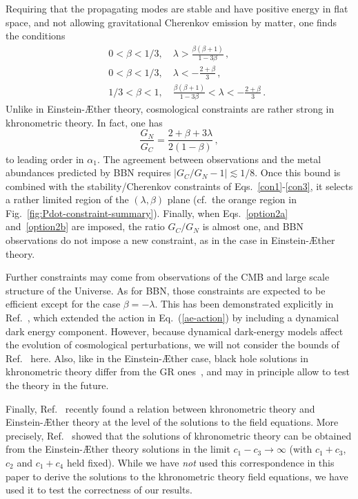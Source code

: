 \documentclass[prd,aps,twocolumn,nofootinbib,showpacs,superscriptaddress]{revtex4-1}
\newcommand\be{\begin{equation}}
\newcommand\ba{\begin{eqnarray}}
\newcommand\ee{\end{equation}}
\newcommand\ea{\end{eqnarray}}
\begin{document}
Requiring that the propagating modes are stable and have positive energy
in flat space, and not allowing gravitational Cherenkov emission by matter, one finds the conditions~\cite{Blas:2010hb,Barausse:2011pu,Elliott:2005va}
\ba
\label{con1}
&&0<\beta<1/3, \quad \lambda > \frac{\beta (\beta+1)}{1-3\beta}\, ,\\\label{con2}
&& 0<\beta<1/3, \quad \lambda<- \frac{2+\beta}{3}\, ,\\\label{con3}
&&1/3<\beta<1,\quad \frac{\beta (\beta+1)} {1-3\beta}<\lambda<- \frac{2+\beta}{3}\,.
\ea
Unlike in Einstein-\AE ther theory, cosmological constraints are rather strong in khronometric theory. In fact, one has
\be
\label{eq:GC-khronometric}
\frac{G_N}{G_C}=\frac{2+\beta+3\lambda}{2(1-\beta)}\, ,
\ee
to leading order in $\alpha_{1}$.  
The agreement between observations and the metal abundances predicted by BBN requires $|G_C/G_N-1|\lesssim 1/8$. Once this bound is combined with the stability/Cherenkov constraints of Eqs.~\eqref{con1}-\eqref{con3}, it selects a rather limited region of the $(\lambda,\beta)$ plane (cf.~the orange region in Fig.~\ref{fig:Pdot-constraint-summary}). Finally, when Eqs.~\eqref{option2a} and~\eqref{option2b} are imposed, the ratio $G_C/G_N$ is almost one, and BBN observations do not impose a new constraint, as in the case in Einstein-\AE ther theory.

Further constraints may come from observations of the CMB and large scale structure of the
Universe. As for BBN, those constraints are expected to be efficient except for the case $\beta=-\lambda$.
This has been demonstrated explicitly in Ref.~\cite{Audren:2013dwa}, which extended the action in Eq.~(\ref{ae-action}) by including a 
dynamical dark energy component. However,
because dynamical  dark-energy models affect the evolution of cosmological perturbations,
we will  not consider the bounds of Ref.~\cite{Audren:2013dwa} here.
Also, like in the Einstein-\AE ther case, black hole solutions in khronometric theory differ from the GR ones~\cite{Eling:2006ec,Blas:2011ni,Barausse:2011pu,Barausse:2013nwa,Barausse:2012ny,Barausse:2012qh,Barausse:2013nwa},
and may in principle allow to test the theory in the future.

Finally, Ref.~\cite{Jacobson:2013xta} recently found a relation between khronometric theory and Einstein-\AE ther theory at the level of the solutions
to the field equations. More precisely, Ref.~\cite{Jacobson:2013xta} showed that the solutions of khronometric theory can be obtained
from the Einstein-\AE ther theory solutions in the limit $c_1-c_3\to \infty$ (with $c_1+c_3$, $c_2$ and $c_1+c_4$ held fixed).
While we have \textit{not} used this correspondence in this paper to derive the solutions to the khronometric theory field equations,
we have used it to test the correctness of our results.
\end{document}
